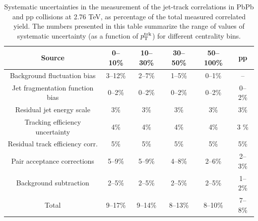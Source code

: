 \begin{table}[htbp]
\begin{center}

\caption[Systematic uncertainties for particle density correlation studies at 2.76 TeV]{Systematic uncertainties in the measurement of the jet-track correlations in PbPb and pp collisions at 2.76 TeV, as percentage of the total measured correlated yield. The numbers presented in this table summarize the range of values of systematic uncertainty (as a function of $p_{\rm T}^{\rm trk}$) for different centrality bins.}
\label{tab:sys1}
\begin{tabular}{c|cccc|c}
\hline
\hline
Source & 0--10\% &  10--30\% & 30--50\% & 50--100\% &  pp \\ \hline
\hline

Background fluctuation bias             & 3--12\% & 2--7\% & 1--5\% & 0--1\% &  -- \\
Jet fragmentation function bias       & 0--2\% &    0--2\% &   0--2\% & 0--2\% &  0--2\% \\
Residual jet energy scale                                   & 3\% &    3\% &   3\% &    3\% &   3\% \\
Tracking efficiency uncertainty          & 4\% & 4\% & 4\% & 4\% &   3 \%  \\
Residual track efficiency corr.              &    5\% &    5\% &    5\% &    5\% &    5\% \\
Pair acceptance corrections                  & 5--9\% & 5--9\% & 4--8\% & 2--6\% &  2--3\% \\
Background subtraction                       & 2--5\% & 2--5\% & 2--5\% & 2--5\% &  1--2\% \\


\hline
Total                                        & 9--17\% & 9--14\% & 8--13\% & 8--10\% & 7--8\% \\

\hline


\end{tabular}
\end{center}
\end{table}



